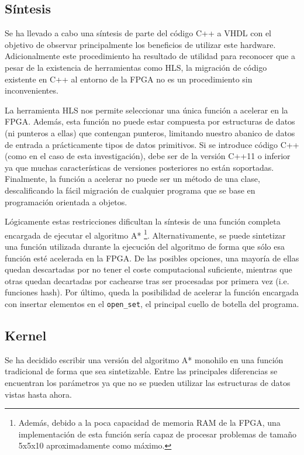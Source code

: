 \subsection{Síntesis}

Se ha llevado a cabo una síntesis de parte del código C++
a VHDL con el objetivo de observar principalmente los
beneficios de utilizar este hardware.
Adicionalmente este procedimiento ha resultado
de utilidad para reconocer que a pesar de la existencia
de herramientas como HLS,
la migración de código existente en C++ al entorno de
la FPGA no es un procedimiento sin inconvenientes. 

La herramienta HLS nos permite seleccionar una única función
a acelerar en la FPGA.
Además, esta función no puede estar compuesta por
estructuras de datos (ni punteros a ellas)
que contengan punteros,
limitando nuestro abanico de datos de entrada a
prácticamente tipos de datos primitivos.
Si se introduce código C++ (como en el caso de esta
investigación), debe ser de la versión C++11 o inferior
ya que muchas características de versiones
posteriores no están soportadas.
Finalmente, la función a acelerar no puede ser un método
de una clase, descalificando la fácil migración
de cualquier programa que se base en programación orientada
a objetos.

Lógicamente estas restricciones dificultan la síntesis
de una función completa encargada de ejecutar el algoritmo A*
\footnote{Además, debido a la poca capacidad de memoria RAM
de la FPGA, una implementación de esta función sería capaz
de procesar problemas de tamaño 5x5x10 aproximadamente
como máximo.}.
Alternativamente, se puede sintetizar una función utilizada
durante la ejecución del algoritmo de forma que sólo esa función
esté acelerada en la FPGA.
De las posibles opciones, una mayoría de ellas quedan descartadas
por no tener el coste computacional suficiente,
mientras que otras quedan decartadas por cachearse
tras ser procesadas por primera vez (i.e. funciones hash).
Por último, queda la posibilidad de acelerar la función encargada
con insertar elementos en el \lstinline{open_set},
el principal cuello de botella del programa.

\pagebreak
\subsection{Kernel}

Se ha decidido escribir una versión del algoritmo A*
monohilo en una función tradicional de forma que sea
sintetizable.
Entre las principales diferencias se encuentran los parámetros
ya que no se pueden utilizar las estructuras de datos vistas
hasta ahora.


